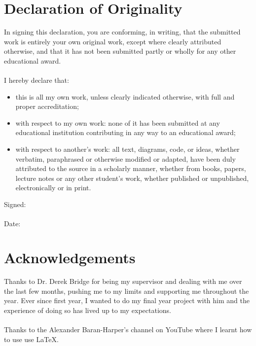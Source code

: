 \documentclass[12pt]{article}
\begin{document}
\section*{Declaration of Originality}
In signing this declaration, you are conforming, in writing, that the submitted work is entirely your own original work, except where clearly attributed otherwise, and that it has not been submitted partly or wholly for any other educational award.
\\\\
I hereby declare that:
\begin{itemize}
  \item this is all my own work, unless clearly indicated otherwise, with full and proper accreditation;
  \item with respect to my own work: none of it has been submitted at any educational institution contributing in any way to an educational award;
  \item with respect to another’s work: all text, diagrams, code, or ideas, whether verbatim, paraphrased or otherwise modified or adapted, have been duly attributed to the source in a scholarly manner, whether from books, papers, lecture notes or any other student’s work, whether published or unpublished, electronically or in print.
\end{itemize}
\vspace{10mm}
\noindent Signed:\dotfill
\\\\
Date:\dotfill
\clearpage

\section*{Acknowledgements}
Thanks to Dr. Derek Bridge for being my supervisor and dealing with me over the last few months, pushing me to my limits and supporting me throughout the year. Ever since first year, I wanted to do my final year project with him and the experience of doing so has lived up to my expectations. 
\\\\
Thanks to the Alexander Baran-Harper's channel on YouTube where I learnt how to use use LaTeX.
\clearpage


\tableofcontents
\thispagestyle{empty}
\cleardoublepage
\end{document}

